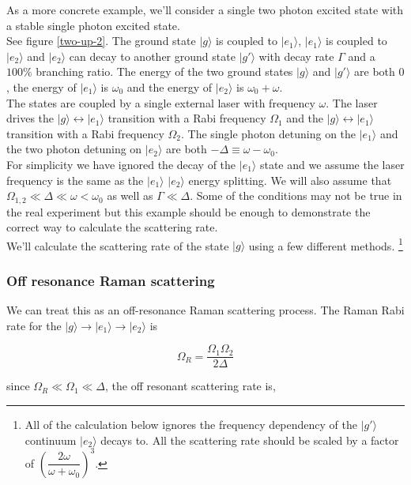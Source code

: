 \documentclass[10pt,fleqn]{article}
\newcommand{\paren}[1]{{\left({#1}\right)}}
\begin{document}
As a more concrete example, we'll consider a single two photon excited state with
a stable single photon excited state.\\

See figure \ref{two-up-2}. The ground state $|g\rangle$ is coupled to $|e_1\rangle$,
$|e_1\rangle$ is coupled to $|e_2\rangle$ and $|e_2\rangle$ can decay to another ground
state $|g'\rangle$ with decay rate $\Gamma$ and a $100\%$ branching ratio.
The energy of the two ground states $|g\rangle$ and $|g'\rangle$ are both $0$,
the energy of $|e_1\rangle$ is $\omega_0$ and the energy of $|e_2\rangle$ is $\omega_0+\omega$.\\

The states are coupled by a single external laser with frequency $\omega$.
The laser drives the $|g\rangle\leftrightarrow|e_1\rangle$ transition
with a Rabi frequency $\Omega_1$ and the $|g\rangle\leftrightarrow|e_1\rangle$ transition
with a Rabi frequency $\Omega_2$. The single photon detuning on the $|e_1\rangle$ and
the two photon detuning on $|e_2\rangle$ are both $-\Delta\equiv\omega-\omega_0$.\\

For simplicity we have ignored the decay of the $|e_1\rangle$ state
and we assume the laser frequency is the same as the $|e_1\rangle$ $|e_2\rangle$
energy splitting. We will also assume that $\Omega_{1,2}\ll\Delta\ll\omega<\omega_0$
as well as $\Gamma\ll\Delta$. Some of the conditions may not be true in the real experiment
but this example should be enough to demonstrate the correct way to calculate
the scattering rate.\\

We'll calculate the scattering rate of the state $|g\rangle$ using a few different methods.
\footnote{All of the calculation below ignores the frequency dependency of the $|g'\rangle$
  continuum $|e_2\rangle$ decays to. All the scattering rate should be scaled by
  a factor of $\paren{\dfrac{2\omega}{\omega+\omega_0}}^3$.}

\subsubsection{Off resonance Raman scattering}

We can treat this as an off-resonance Raman scattering process.
The Raman Rabi rate for the $|g\rangle\rightarrow|e_1\rangle\rightarrow|e_2\rangle$ is

\[\Omega_R=\frac{\Omega_1\Omega_2}{2\Delta}\]

since $\Omega_R\ll\Omega_1\ll\Delta$, the off resonant scattering rate is,
\end{document}
